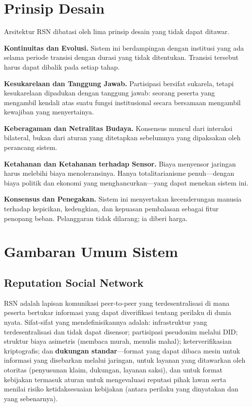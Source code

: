 \documentclass[11pt,a4paper,twocolumn]{article}
\begin{document}
\section{Prinsip Desain}

Arsitektur RSN dibatasi oleh lima prinsip desain yang tidak dapat ditawar.

\textbf{Kontinuitas dan Evolusi.} Sistem ini berdampingan dengan institusi yang ada selama periode transisi dengan durasi yang tidak ditentukan. Transisi tersebut harus dapat dibalik pada setiap tahap.

\textbf{Kesukarelaan dan Tanggung Jawab.} Partisipasi bersifat sukarela, tetapi kesukarelaan dipadukan dengan tanggung jawab: seorang peserta yang mengambil kendali atas suatu fungsi institusional secara bersamaan mengambil kewajiban yang menyertainya.

\textbf{Keberagaman dan Netralitas Budaya.} Konsensus muncul dari interaksi bilateral, bukan dari aturan yang ditetapkan sebelumnya yang dipaksakan oleh perancang sistem.

\textbf{Ketahanan dan Ketahanan terhadap Sensor.} Biaya menyensor jaringan harus melebihi biaya menoleransinya. Hanya totalitarianisme penuh---dengan biaya politik dan ekonomi yang menghancurkan---yang dapat menekan sistem ini.

\textbf{Konsensus dan Penegakan.} Sistem ini menyertakan kecenderungan manusia terhadap kepicikan, kedengkian, dan kepuasan pembalasan sebagai fitur penopang beban. Pelanggaran tidak dilarang; ia diberi harga.

\section{Gambaran Umum Sistem}

\subsection{Reputation Social Network}

RSN adalah lapisan komunikasi peer-to-peer yang terdesentralisasi di mana peserta bertukar informasi yang dapat diverifikasi tentang perilaku di dunia nyata. Sifat-sifat yang mendefinisikannya adalah: infrastruktur yang terdesentralisasi dan tidak dapat disensor; partisipasi pseudonim melalui DID; struktur biaya asimetris (membaca murah, menulis mahal); keterverifikasian kriptografis; dan \textbf{dukungan standar}---format yang dapat dibaca mesin untuk informasi yang disebarkan melalui jaringan, untuk layanan yang ditawarkan oleh otoritas (penyusunan klaim, dukungan, layanan saksi), dan untuk format kebijakan termasuk aturan untuk mengevaluasi reputasi pihak lawan serta menilai risiko ketidaksesuaian kebijakan (antara perilaku yang dinyatakan dan yang sebenarnya).
\end{document}
